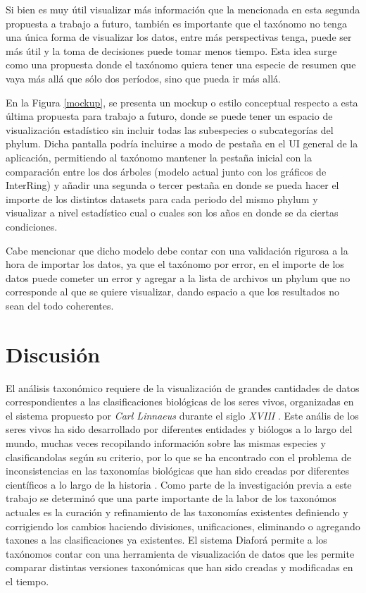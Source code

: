 \documentclass[journal]{IEEEtran}
\begin{document}
Si bien es muy útil visualizar más información que la mencionada en esta segunda propuesta a trabajo a futuro, también es importante que el taxónomo no tenga una única forma de visualizar los datos, entre más perspectivas tenga, puede ser más útil y la toma de decisiones puede tomar menos tiempo. Esta idea surge como una propuesta donde el taxónomo quiera tener una especie de resumen que vaya más allá que sólo dos períodos, sino que pueda ir más allá.

En la Figura \ref{mockup}, se presenta un mockup o estilo conceptual respecto a esta última propuesta para trabajo a futuro, donde se puede tener un espacio de visualización estadístico sin incluir todas las subespecies o subcategorías del phylum. Dicha pantalla podría incluirse a modo de pestaña en el UI general de la aplicación, permitiendo al taxónomo mantener la pestaña inicial con la comparación entre los dos árboles (modelo actual junto con los gráficos de InterRing) y añadir una segunda o tercer pestaña en donde se pueda hacer el importe de los distintos datasets para cada periodo del mismo phylum y visualizar a nivel estadístico cual o cuales son los años en donde se da ciertas condiciones.

Cabe mencionar que dicho modelo debe contar con una validación rigurosa a la hora de importar los datos, ya que el taxónomo por error, en el importe de los datos puede cometer un error y agregar a la lista de archivos un phylum que no corresponde al que se quiere visualizar, dando espacio a que los resultados no sean del todo coherentes.


\section {Discusión}
El análisis taxonómico requiere de la visualización de grandes cantidades de datos correspondientes a las clasificaciones biológicas de los seres vivos, organizadas en el sistema 
propuesto por \emph{Carl Linnaeus} durante el siglo \emph{XVIII} \cite{linne}.
Este anális de los seres vivos  ha sido desarrollado por diferentes entidades y biólogos a lo largo del mundo, muchas veces recopilando información sobre las mismas especies
y clasificandolas según su criterio, por lo que se ha encontrado con el problema de inconsistencias en las taxonomías biológicas que han sido creadas por 
diferentes científicos a lo largo de la historia \cite{avise_liu_2011}.
Como parte de la investigación previa a este trabajo se determinó que una parte importante de la labor de los taxonómos actuales es la curación y refinamiento de las taxonomías existentes
definiendo y corrigiendo los cambios haciendo divisiones, unificaciones, eliminando o agregando taxones a las clasificaciones ya existentes.
El sistema Diaforá \cite{sancho_diafora} permite a los taxónomos contar con una herramienta  de visualización de datos que les permite comparar distintas versiones taxonómicas que han sido creadas y modificadas en el tiempo.
\end{document}

